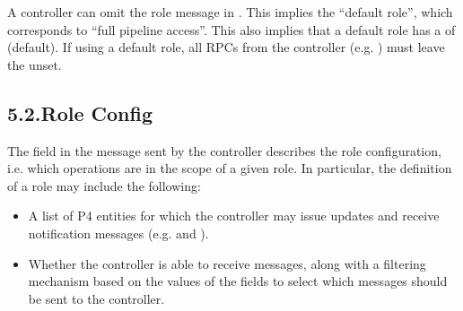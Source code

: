 \documentclass[11pt]{article}
\begin{document}
{%
\noindent{}A controller can omit the role message in . This
implies the \textquotedblleft{}default role\textquotedblright{}, which corresponds to \textquotedblleft{}full pipeline access\textquotedblright{}.
This also implies that a default role has a  of  (default).
If using a default role, all RPCs from the controller (e.g. ) must
leave the  unset.%

\subsection{5.2.\hspace*{0.5em}Role Config}\label{sec-arbitration-role-config}%

\noindent{}The  field in the  message sent by the
controller describes the role configuration, i.e. which operations are in the
scope of a given role. In particular, the definition of a role may include the
following:%

\begin{itemize}[noitemsep,topsep=\mdcompacttopsep]%

\item{}A list of P4 entities for which the controller may issue  updates and
receive notification messages (e.g.  and
).%

\item{}Whether the controller is able to receive  messages, along with a
filtering mechanism based on the values of the  fields to
select which  messages should be sent to the controller.%


\end{itemize}}
\end{document}
